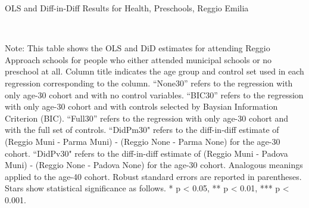 \begin{landscape}

\begin{table}[H] \caption{OLS and Diff-in-Diff Results for Health, Preschools, Reggio Emilia} \label{ols-H-reg}
\scalebox{0.85}{
}
\vspace{1ex} \\
\footnotesize\raggedright{Note: This table shows the OLS and DiD estimates for attending Reggio Approach schools for people who either attended municipal schools or no preschool at all. Column title indicates the age group and control set used in each regression corresponding to the column. ``None30'' refers to the regression with only age-30 cohort and with no control variables. ``BIC30'' refers to the regression with only age-30 cohort and with controls selected by Baysian Information Criterion (BIC). ``Full30'' refers to the regression with only age-30 cohort and with the full set of controls. ``DidPm30" refers to the diff-in-diff estimate of (Reggio Muni - Parma Muni) - (Reggio None - Parma None) for the age-30 cohort. ``DidPv30" refers to the diff-in-diff estimate of (Reggio Muni - Padova Muni) - (Reggio None - Padova None) for the age-30 cohort. Analogous meanings applied to the age-40 cohort. Robust standard errors are reported in parentheses. Stars show statistical significance as follows. * p < 0.05, ** p < 0.01, *** p < 0.001.}
\end{table}




\end{landscape}
